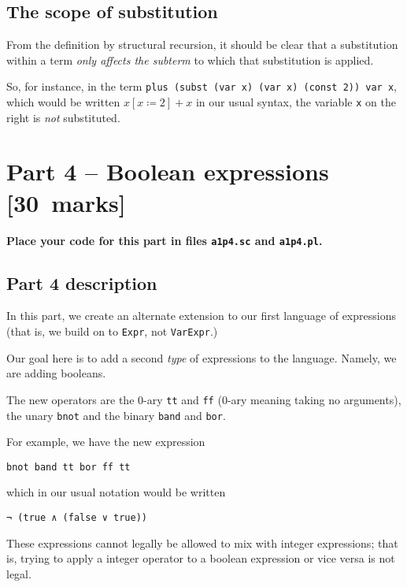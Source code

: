 \documentclass[11pt]{article}
\begin{document}
\subsection*{The scope of substitution}
\label{sec:org2013e0d}
From the definition by structural recursion, it should be clear
that a substitution within a term \emph{only affects the subterm} to which
that substitution is applied.

So, for instance, in the term \texttt{plus (subst (var x) (var x) (const 2)) var x},
which would be written \(x[x ≔ 2] + x\) in our usual syntax,
the variable \texttt{x} on the right is \emph{not} substituted.

\section*{Part 4 – Boolean expressions           [30 marks]}
\label{sec:orgf95f5e5}
\begin{center}
\textbf{Place your code for this part in files \texttt{a1p4.sc} and \texttt{a1p4.pl}.}
\end{center}

\subsection*{Part 4 description}
\label{sec:org5094a7b}
In this part, we create an alternate extension to
our first language of expressions
(that is, we build on to \texttt{Expr}, not \texttt{VarExpr}.)

Our goal here is to add
a second \emph{type} of expressions to the language.
Namely, we are adding booleans.

The new operators are
the 0-ary \texttt{tt} and \texttt{ff} (0-ary meaning taking no arguments),
the unary \texttt{bnot} and the binary \texttt{band} and \texttt{bor}.

For example, we have the new expression
\begin{verbatim}
bnot band tt bor ff tt
\end{verbatim}
which in our usual notation would be written
\begin{verbatim}
¬ (true ∧ (false ∨ true))
\end{verbatim}

These expressions cannot legally be allowed to mix
with integer expressions; that is,
trying to apply a integer operator to a boolean expression
or vice versa is not legal.
\end{document}
